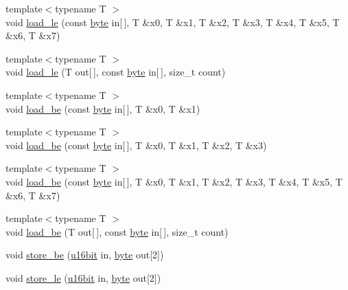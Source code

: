 \begin{DoxyCompactItemize}
\item 
{\footnotesize template$<$typename T $>$ }\\void \hyperlink{namespaceBotan_a0df6088147ee275ca08498cce8c42898}{load\-\_\-le} (const \hyperlink{namespaceBotan_a7d793989d801281df48c6b19616b8b84}{byte} in\mbox{[}$\,$\mbox{]}, T \&x0, T \&x1, T \&x2, T \&x3, T \&x4, T \&x5, T \&x6, T \&x7)
\item 
{\footnotesize template$<$typename T $>$ }\\void \hyperlink{namespaceBotan_a57b8dbad2709a1c289d802e7f8b7d4ca}{load\-\_\-le} (T out\mbox{[}$\,$\mbox{]}, const \hyperlink{namespaceBotan_a7d793989d801281df48c6b19616b8b84}{byte} in\mbox{[}$\,$\mbox{]}, size\-\_\-t count)
\item 
{\footnotesize template$<$typename T $>$ }\\void \hyperlink{namespaceBotan_aa0a041cb2f5800afd39fb19d8cbf4c29}{load\-\_\-be} (const \hyperlink{namespaceBotan_a7d793989d801281df48c6b19616b8b84}{byte} in\mbox{[}$\,$\mbox{]}, T \&x0, T \&x1)
\item 
{\footnotesize template$<$typename T $>$ }\\void \hyperlink{namespaceBotan_a654254185dea298db752f8ae5ed2a4fa}{load\-\_\-be} (const \hyperlink{namespaceBotan_a7d793989d801281df48c6b19616b8b84}{byte} in\mbox{[}$\,$\mbox{]}, T \&x0, T \&x1, T \&x2, T \&x3)
\item 
{\footnotesize template$<$typename T $>$ }\\void \hyperlink{namespaceBotan_a11fb01a808629753d6499a7ec92e401c}{load\-\_\-be} (const \hyperlink{namespaceBotan_a7d793989d801281df48c6b19616b8b84}{byte} in\mbox{[}$\,$\mbox{]}, T \&x0, T \&x1, T \&x2, T \&x3, T \&x4, T \&x5, T \&x6, T \&x7)
\item 
{\footnotesize template$<$typename T $>$ }\\void \hyperlink{namespaceBotan_a38b46679a64e91c8f9a922b9f78616ce}{load\-\_\-be} (T out\mbox{[}$\,$\mbox{]}, const \hyperlink{namespaceBotan_a7d793989d801281df48c6b19616b8b84}{byte} in\mbox{[}$\,$\mbox{]}, size\-\_\-t count)
\item 
void \hyperlink{namespaceBotan_ae1c70aa3f8dc385497cdee4fbab06203}{store\-\_\-be} (\hyperlink{namespaceBotan_ab07face63a00c39ea6ed97f203ee501c}{u16bit} in, \hyperlink{namespaceBotan_a7d793989d801281df48c6b19616b8b84}{byte} out\mbox{[}2\mbox{]})
\item 
void \hyperlink{namespaceBotan_aedbf00189827252decaa3e2578d14be5}{store\-\_\-le} (\hyperlink{namespaceBotan_ab07face63a00c39ea6ed97f203ee501c}{u16bit} in, \hyperlink{namespaceBotan_a7d793989d801281df48c6b19616b8b84}{byte} out\mbox{[}2\mbox{]})

\end{DoxyCompactItemize}
